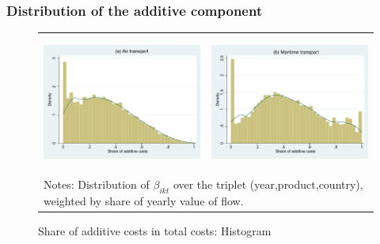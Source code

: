 \documentclass[10 pt,Helvetica, french]{beamer}
\begin{document}
\begin{frame}[label = slide_result2_more]
\frametitle{Distribution of the additive component}

\begin{figure}[htbp]
\caption{Share of additive costs in total costs: Histogram}
\label{fig:histogram_beta}
\begin{center}
\begin{tabular}{cc}
\includegraphics[width=5.5cm, height=4.5cm]{Etude_beta_pondere_air.pdf}
& \includegraphics[width=5.5cm, height=4.5cm]{Etude_beta_pondere_ves.pdf} \\
\multicolumn{2}{l}{{\tiny Notes: Distribution of $\beta_{ikt}$ over the triplet (year,product,country), weighted by share of yearly value of flow.}}\\
\end{tabular}
\end{center}
\end{figure}


 \end{frame}
\end{document}
